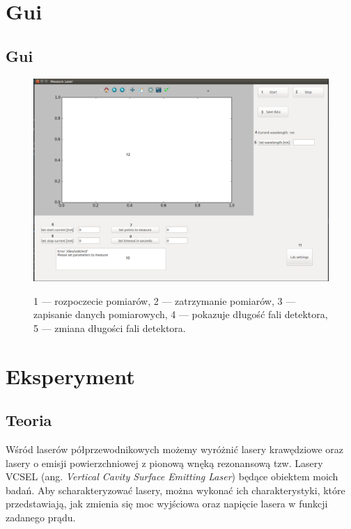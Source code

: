 \documentclass[a4paper, portrait,12pt]{report}
\begin{document}
\chapter{Gui}
\section{Gui}
\begin{figure}[h]
\center
  \includegraphics[scale=0.35]{gui.png}
  \label{rys1}
  \caption{1 --- rozpoczecie pomiarów, 2 --- zatrzymanie pomiarów, 3 --- zapisanie danych pomiarowych, 4 --- pokazuje długość fali detektora, 5 --- zmiana długości fali detektora.} 
\end{figure}
\chapter{Eksperyment} \label{Eksperyment}
\section{Teoria}
Wśród laserów półprzewodnikowych możemy wyróżnić lasery krawędziowe oraz lasery o emisji powierzchniowej z pionową wnęką rezonansową tzw. Lasery VCSEL (ang. \textit{Vertical Cavity Surface Emitting Laser}) będące obiektem moich badań. Aby scharakteryzować lasery, można wykonać ich charakterystyki, które przedstawiają, jak zmienia się moc wyjściowa oraz napięcie lasera w funkcji zadanego prądu.
\end{document}
